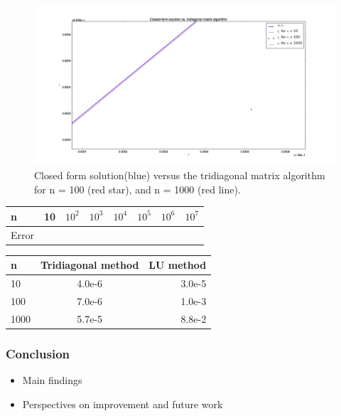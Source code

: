 \documentclass[12pt]{article}
\begin{document}
\begin{center}
    \begin{figure}[h!]
        \includegraphics[width=1.4\textwidth]{figure_1b_zoom.png}
        \caption{Closed form solution(blue) versus the     tridiagonal matrix algorithm for n = 100 (red star), and n = 1000 (red line). }
        \label{fig:1bz}
    \end{figure}
\end{center}

\begin{center}
  \begin{tabular}{ l | c | c | c | c | c | c | r}
  n & 10 &$10^2$ &$10^3$ &$10^4$& $10^5$&$10^6$&$10^7$\\ \hline
    Error &&&&&&& \\
  \end{tabular}
\end{center}

\begin{center}
  \begin{tabular}{ l | c | r }
    n & Tridiagonal method & LU method \\ \hline
    10 & 4.0e-6 & 3.0e-5 \\
    100 & 7.0e-6 & 1.0e-3 \\
    1000 & 5.7e-5& 8.8e-2 \\
  \end{tabular}
\end{center}
\subsubsection*{Conclusion}

\begin{itemize}
\item Main findings
\item Perspectives on improvement and future work
\end{itemize}
\end{document}
